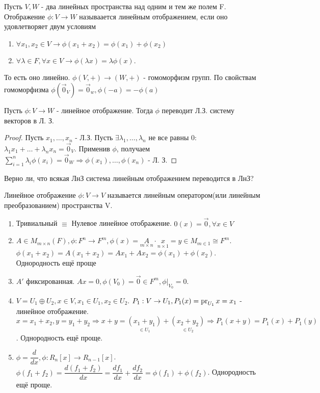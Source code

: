 \begin{definition}
	Пусть \(V, W\) - два линейных пространства над одним и тем же полем F. Отображение \(\phi:V\to W\) называается линейным отображением, если оно удовлетворяет двум условиям 
	\begin{enumerate}
		\item \(\forall x_1, x_2\in V\to \phi(x_1+x_2) = \phi(x_1)+\phi(x_2)\)
		\item \(\forall \lambda \in F, \forall x\in V\to \phi(\lambda x) = \lambda\phi(x)\).
	\end{enumerate}
	То есть оно линейно. \(\phi(V, +)\to(W, +)\) - гомоморфизм групп. По свойствам гомоморфизма \(\phi(\vec 0_V) = \vec 0_w, \phi(-a) = - \phi(a)\)
\end{definition}
\begin{proposition}
	Пусть \(\phi:V\to W\) - линейное отображение. Тогда $\phi$ переводит Л.З. систему векторов в Л. З. 
\end{proposition}
\begin{proof}
	Пусть \(x_1, \ldots, x_n\) - Л.З. Пусть \(\exists \lambda_1, \ldots, \lambda_n\) не все равны 0: \(\lambda_1x_1 + \ldots + \lambda_n x_n = \vec 0_V\). Применив $\phi$, получаем \(\sum_{i=1}^{n}\lambda_i\phi(x_i) = \vec 0_W\Longrightarrow \phi(x_1), \ldots, \phi(x_n)\) - Л. З.
\end{proof}
Верно ли, что всякая ЛнЗ система линейным отображением переводится в ЛнЗ?
\begin{definition}
	Линейное отображение $\phi:V\to V$ называется линейным оператором(или линейным преобразованием) пространства V.
\end{definition}
\begin{example}
	\begin{enumerate}
		\item Тривиальный \(\equiv\) Нулевое линейное отображение. \(0(x) = \vec 0, \forall x\in V\)
		\item \(A\in M_{m\times n}(F), \phi: F^n \to F^m, \phi(x) = \underset{m\times n}{A}\cdot \underset{n\times1}{x} = y \in M_{m\in 1} \cong F^m\). \(\phi(x_1+x_2) = A(x_1 + x_2) = Ax_1 + Ax_2 = \phi(x_1) + \phi(x_2)\). Однородность ещё проще
		\item  \(A'\) фиксированная. \(Ax = 0, \phi(V_0) = \vec 0\in F^m, \phi|_{V_0} = 0\).
		\item \(V = U_1\oplus U_2, x \in V, x_1\in U_1, x_2\in U_2\). \(P_1:V\to U_1, P_1(x) = \operatorname{pr}_{U_1}x = x_1\) - линейное отображение. \(x = x_1 + x_2, y = y_1 + y_2\Longrightarrow x+y = \underset{\in U_1}{(x_1+y_1)} + \underset{\in U_2}{(x_2+y_2)} \Longrightarrow P_1(x+y) = P_1(x) + P_1(y)\). Однородность ещё проще.
		\item \(\phi = \dfrac{d}{dx}, \phi:R_n[x]\to R_{n-1}[x]\). \(\phi(f_1+f_2) = \dfrac{d(f_1+f_2)}{dx} = \dfrac{df_1}{dx}+\dfrac{df_2}{dx} = \phi(f_1)+\phi(f_2)\). Однородность ещё проще.
	\end{enumerate}
\end{example}

